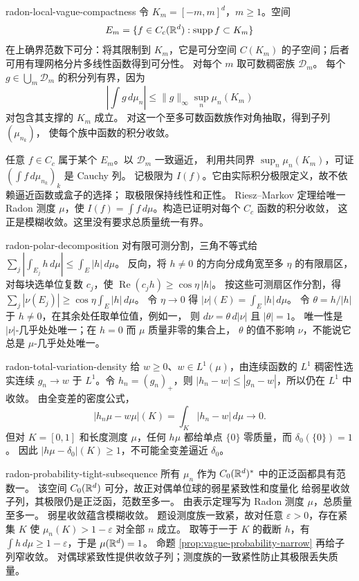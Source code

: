 \begin{solution}{radon-local-vague-compactness}
令 \(K_m=[-m,m]^d\)，\(m\ge1\)。空间
\[
 E_m=\{f\in C_c(\mathbb{R}^d):\operatorname{supp}f\subset K_m\}
\]
在上确界范数下可分：将其限制到 \(K_m\)，它是可分空间 \(C(K_m)\)
的子空间；后者可用有理网格分片多线性函数得到可分性。
对每个 \(m\) 取可数稠密族 \(\mathcal D_m\)。
每个 \(g\in\bigcup_m\mathcal D_m\) 的积分列有界，因为
\[
 \left|\int g\,d\mu_n\right|
 \le\|g\|_\infty\sup_n\mu_n(K_m)
\]
对包含其支撑的 \(K_m\) 成立。
对这一个至多可数函数族作对角抽取，得到子列 \((\mu_{n_k})\)，
使每个族中函数的积分收敛。

任意 \(f\in C_c\) 属于某个 \(E_m\)。以 \(\mathcal D_m\) 一致逼近，
利用共同界 \(\sup_n\mu_n(K_m)\)，可证
\((\int f\,d\mu_{n_k})_k\) 是 Cauchy 列。
记极限为 \(I(f)\)。它由实际积分极限定义，故不依赖逼近函数或盒子的选择；
取极限保持线性和正性。
Riesz--Markov 定理给唯一 Radon 测度 \(\mu\)，使
\(I(f)=\int f\,d\mu\)。构造已证明对每个 \(C_c\) 函数的积分收敛，
这正是模糊收敛。这里没有要求总质量统一有界。
\end{solution}

\begin{solution}{radon-polar-decomposition}
对有限可测分割，三角不等式给
\(\sum_j|\int_{E_j}h\,d\mu|\le\int_E|h|\,d\mu\)。
反向，将 \(h\ne0\) 的方向分成角宽至多 \(\eta\) 的有限扇区，
对每块选单位复数 \(c_j\)，使
\(\operatorname{Re}(c_jh)\ge\cos\eta\,|h|\)。
按这些可测扇区作分割，得
\(\sum_j|\nu(E_j)|\ge\cos\eta\int_E|h|\,d\mu\)。
令 \(\eta\to0\) 得 \(|\nu|(E)=\int_E|h|\,d\mu\)。
令 \(\theta=h/|h|\) 于 \(h\ne0\)，在其余处任取单位值，例如一，
则 \(d\nu=\theta\,d|\nu|\) 且 \(|\theta|=1\)。
唯一性是 \(|\nu|\)-几乎处处唯一；在 \(h=0\) 而 \(\mu\) 质量非零的集合上，
\(\theta\) 的值不影响 \(\nu\)，不能说它总是 \(\mu\)-几乎处处唯一。
\end{solution}

\begin{solution}{radon-total-variation-density}
给 \(w\ge0\)、\(w\in L^1(\mu)\)，由连续函数的 \(L^1\) 稠密性选实连续
\(g_n\to w\) 于 \(L^1\)。令 \(h_n=(g_n)_+\)，则
\(|h_n-w|\le|g_n-w|\)，所以仍在 \(L^1\) 中收敛。
由全变差的密度公式，
\[
 |h_n\mu-w\mu|(K)=\int_K|h_n-w|\,d\mu\longrightarrow0.
\]
但对 \(K=[0,1]\) 和长度测度 \(\mu\)，任何 \(h\mu\) 都给单点
\(\{0\}\) 零质量，而 \(\delta_0(\{0\})=1\)。
因此 \(|h\mu-\delta_0|(K)\ge1\)，不可能全变差逼近 \(\delta_0\)。
\end{solution}

\begin{solution}{radon-probability-tight-subsequence}
所有 \(\mu_n\) 作为 \(C_0(\mathbb{R}^d)^*\) 中的正泛函都具有范数一。
该空间 \(C_0(\mathbb{R}^d)\) 可分，故正对偶单位球的弱星紧致性和度量化
给弱星收敛子列，其极限仍是正泛函，范数至多一。
由表示定理写为 Radon 测度 \(\mu\)，总质量至多一。
弱星收敛蕴含模糊收敛。
题设测度族一致紧，故对任意 \(\varepsilon>0\)，存在紧集 \(K\) 使
\(\mu_n(K)>1-\varepsilon\) 对全部 \(n\) 成立。
取等于一于 \(K\) 的截断 \(h\)，有
\(\int h\,d\mu\ge1-\varepsilon\)，于是 \(\mu(\mathbb{R}^d)=1\)。
命题 \ref{prop:vague-probability-narrow} 再给子列窄收敛。
对偶球紧致性提供收敛子列；测度族的一致紧性防止其极限丢失质量。
\end{solution}
